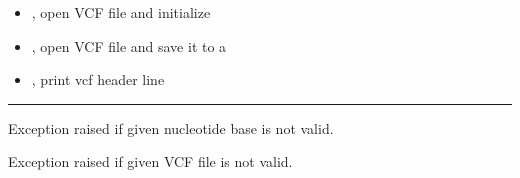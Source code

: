 \documentclass[letterpaper,10pt,english]{sphinxmanual}
\begin{document}
\begin{description}
\begin{itemize}
\item {} 
{\hyperref[vcf:libPoMo.vcf.init_seq]{}}, open VCF file and initialize 

\item {} 
{\hyperref[vcf:libPoMo.vcf.open_seq]{}}, open VCF file and save it to a 

\item {} 
{\hyperref[vcf:libPoMo.vcf.get_header_line_string]{}}, print vcf header line

\end{itemize}

\end{description}


\bigskip\hrule{}\bigskip


\begin{fulllineitems}
\label{vcf:libPoMo.vcf.NotANucBaseError}
Exception raised if given nucleotide base is not valid.

\end{fulllineitems}


\begin{fulllineitems}
\label{vcf:libPoMo.vcf.NotAVariantCallFormatFileError}
Exception raised if given VCF file is not valid.

\end{fulllineitems}

\end{document}
